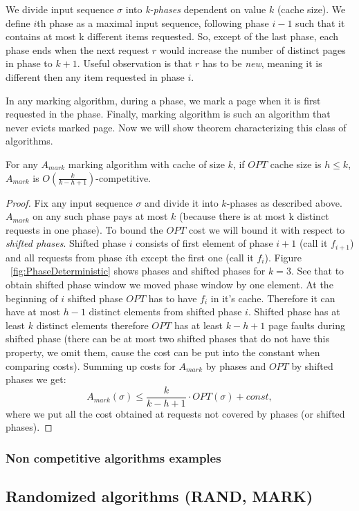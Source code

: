 We divide input sequence $\sigma$ into \textit{k-phases} dependent on value $k$ 
(cache size). We define $i$th phase as a maximal input sequence, following 
phase $i-1$ such that it contains at most k different items requested. So, 
except of the last phase, each phase ends when the next request $r$ would 
increase the number of distinct pages in phase to $k+1$. Useful observation is 
that $r$ has to be \textit{new}, meaning it is different then any item requested 
in phase $i$.


In any marking algorithm, during a phase, we mark a page when it is first 
requested in the phase. Finally, marking algorithm is such an algorithm that 
never evicts marked page. Now we will show theorem characterizing this class of 
algorithms.
\begin{theorem}
For any $A_{mark}$ marking algorithm with cache of size $k$, if $OPT$ cache 
size is $h \leq k$, $A_{mark}$ is $O(\frac{k}{k-h+1})$-competitive.
\end{theorem}
\begin{proof}
Fix any input sequence $\sigma$ and divide it into $k$-phases as described 
above. $A_{mark}$ on any such phase pays at most $k$ (because there is at most 
k distinct requests in one phase). To bound the $OPT$ cost we will bound it with 
respect to \textit{shifted phases}. Shifted phase $i$ consists 
of first element of phase $i+1$ (call it $f_{i+1}$) and all requests from phase 
$i$th except the first one (call it $f_i$). Figure 
~\ref{fig:PhaseDeterministic} shows phases and shifted phases for $k=3$. See 
that to obtain shifted phase window we moved phase window by one element. At 
the beginning of $i$ shifted phase $OPT$ has to have $f_i$ in it's cache. 
Therefore it can have at most $h-1$ distinct elements from shifted phase $i$. 
Shifted phase has at least $k$ distinct elements therefore $OPT$ has at least 
$k-h+1$ page faults during shifted phase (there can be at most two shifted 
phases that do not have this property, we omit them, cause the cost can be put 
into the constant when comparing costs).
Summing up costs for $A_{mark}$ by phases and $OPT$ by shifted phases we get:
$$ A_{mark}(\sigma) \leq \frac{k}{k-h+1} \cdot OPT(\sigma) + const,$$
where we put all the cost obtained at requests not covered by phases (or 
shifted phases).
\end{proof}



\subsubsection{Non competitive algorithms examples}

\subsection{Randomized algorithms (RAND, MARK)}
